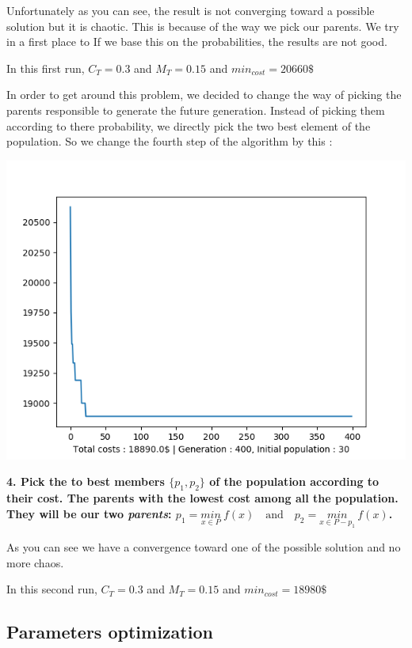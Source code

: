 \documentclass[11pt]{article}
\begin{document}
Unfortunately as you can see, the result is not converging toward a
possible solution but it is chaotic. This is because of the way we pick
our parents. We try in a first place to If we base this on the
probabilities, the results are not good.

In this first run, \(C_{T} = 0.3\) and \(M_{T}=0.15\) and
\(min_{cost}=20660\$\)

\pagebreak

In order to get around this problem, we decided to change the way of
picking the parents responsible to generate the future generation.
Instead of picking them according to there probability, we directly pick
the two best element of the population. So we change the fourth step of
the algorithm by this :

\begin{center}
\includegraphics{image_genetic_airplane_2}
\end{center}

\textbf{4. Pick the to best members \(\{p_1,p_2\}\) of the population
according to their cost. The parents with the lowest cost among all the
population. They will be our two \emph{parents}:
\(p_1 = \underset{x \in P}{min}\ f(x) \quad \textrm{and} \quad p_2 = \underset{x \in P-{p_1}}{min}\ f(x)\).}

As you can see we have a convergence toward one of the possible solution
and no more chaos.

In this second run, \(C_{T} = 0.3\) and \(M_{T}=0.15\) and
\(min_{cost}=18980\$\)

\pagebreak

    \hypertarget{parameters-optimization}{%
\subsection{Parameters optimization}\label{parameters-optimization}}
\end{document}
